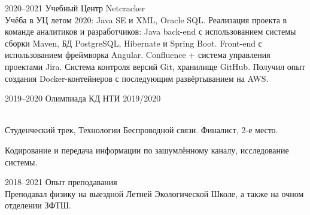 \documentclass[]{cv-style}          %
\begin{document}
\begin{entrylist}

\entry
    {2020--2021}
    {Учебный Центр Netcracker}
    {}
    {\jobtitle{}\\ 
Учёба в УЦ летом 2020: Java SE и XML, Oracle SQL. Реализация проекта в команде аналитиков и разработчиков: Java back-end с использованием системы сборки Maven, БД PostgreSQL, Hibernate и Spring Boot. Front-end с использованием фреймворка Angular. Confluence + система управления проектами Jira. Система контроля версий Git, хранилище GitHub. Получил опыт создания Docker-контейнеров с последующим развёртыванием на AWS.}

\entry
    {2019--2020}
    {Олимпиада КД НТИ 2019/2020}
    {}
    {\jobtitle{}\\
Студенческий трек, Технологии Беспроводной связи. Финалист, 2-е место.

Кодирование и передача информации по зашумлённому каналу, исследование системы.}


\entry
    {2018--2021}
    {Опыт преподавания}
    {}
    {\jobtitle{}\\
Преподавал физику на выездной Летней Экологической Школе, а также на очном отделении ЗФТШ.}

%
%
%
%

\end{entrylist}
\end{document}

